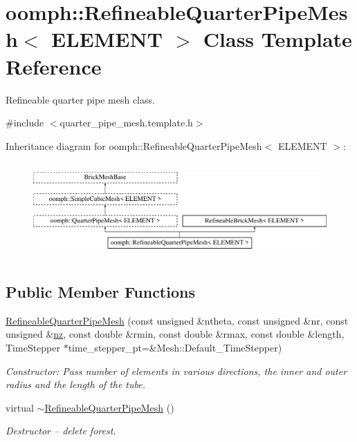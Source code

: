 \hypertarget{classoomph_1_1RefineableQuarterPipeMesh}{}\section{oomph\+:\+:Refineable\+Quarter\+Pipe\+Mesh$<$ E\+L\+E\+M\+E\+NT $>$ Class Template Reference}
\label{classoomph_1_1RefineableQuarterPipeMesh}


Refineable quarter pipe mesh class.  




{\ttfamily \#include $<$quarter\+\_\+pipe\+\_\+mesh.\+template.\+h$>$}

Inheritance diagram for oomph\+:\+:Refineable\+Quarter\+Pipe\+Mesh$<$ E\+L\+E\+M\+E\+NT $>$\+:\begin{figure}[H]
\begin{center}
\leavevmode
\includegraphics[height=3.672131cm]{classoomph_1_1RefineableQuarterPipeMesh}
\end{center}
\end{figure}
\subsection*{Public Member Functions}
\begin{DoxyCompactItemize}
\item 
\hyperlink{classoomph_1_1RefineableQuarterPipeMesh_ac4b3f592279a2437487ddce284b406a6}{Refineable\+Quarter\+Pipe\+Mesh} (const unsigned \&ntheta, const unsigned \&nr, const unsigned \&\hyperlink{classoomph_1_1SimpleCubicMesh_ad78725440e4e87598fd9339653b28e61}{nz}, const double \&rmin, const double \&rmax, const double \&length, Time\+Stepper $\ast$time\+\_\+stepper\+\_\+pt=\&Mesh\+::\+Default\+\_\+\+Time\+Stepper)
\begin{DoxyCompactList}\small\item\em Constructor\+: Pass number of elements in various directions, the inner and outer radius and the length of the tube. \end{DoxyCompactList}\item 
virtual \hyperlink{classoomph_1_1RefineableQuarterPipeMesh_ad2015da2ae7382f3fe2c3a088f4fa021}{$\sim$\+Refineable\+Quarter\+Pipe\+Mesh} ()
\begin{DoxyCompactList}\small\item\em Destructor -- delete forest. \end{DoxyCompactList}\end{DoxyCompactItemize}
